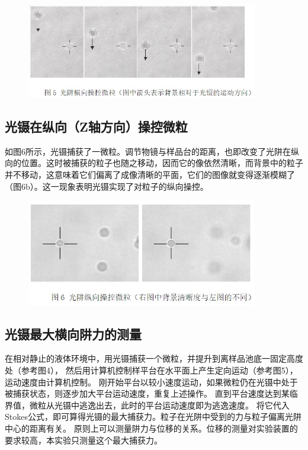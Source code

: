 \documentclass[a4paper,UTF8]{ctexart}
\begin{document}
\begin{figure}[H]
    \centering
    \begin{minipage}[b]{0.9\textwidth}
        \centering
        \includegraphics[width=0.9\textwidth]{./fig5.jpg}
    \end{minipage}
\end{figure}

\subsection{光镊在纵向（Z轴方向）操控微粒}

如图6所示，光镊捕获了一微粒。调节物镜与样品台的距离，也即改变了光阱在纵向的位置。这时被捕获的粒子也随之移动，因而它的像依然清晰，而背景中的粒子并不移动，这意味着它们偏离了成像清晰的平面，它们的图像就变得逐渐模糊了（图6b）。这一现象表明光镊实现了对粒子的纵向操控。

\begin{figure}[H]
    \centering
    \begin{minipage}[b]{0.9\textwidth}
        \centering
        \includegraphics[width=0.9\textwidth]{./fig6.jpg}
    \end{minipage}
\end{figure}

\subsection{光镊最大横向阱力的测量}

在相对静止的液体环境中，用光镊捕获一个微粒，并提升到离样品池底一固定高度处（参考图4），
然后用计算机控制样平台在水平面上产生定向运动（参考图5），运动速度由计算机控制。
刚开始平台以较小速度运动，如果微粒仍在光镊中处于被捕获状态，则逐步加大平台运动速度，重复上述操作。
直到平台速度达到某临界值，微粒从光镊中逃逸出去，此时的平台运动速度即为逃逸速度。
将它代入Stokes公式，即可算得光镊的最大捕获力。粒子在光阱中受到的力与粒子偏离光阱中心的距离有关。
原则上可以测量阱力与位移的关系。位移的测量对实验装置的要求较高，本实验只测量这个最大捕获力。
\end{document}
